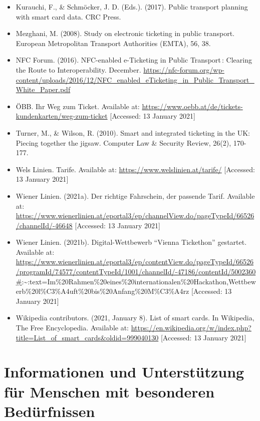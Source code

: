 \documentclass[
]{book}
\providecommand{\tightlist}{%
  \setlength{\itemsep}{0pt}\setlength{\parskip}{0pt}}
\begin{document}
\begin{itemize}
\tightlist
\item
  Kurauchi, F., \& Schmöcker, J. D. (Eds.). (2017). Public transport planning with smart card data. CRC Press.
\item
  Mezghani, M. (2008). Study on electronic ticketing in public transport. European Metropolitan Transport Authorities (EMTA), 56, 38.
\item
  NFC Forum. (2016). NFC-enabled e-Ticketing in Public Transport\,: Clearing the Route to Interoperability. December. \url{https://nfc-forum.org/wp-content/uploads/2016/12/NFC_enabled_eTicketing_in_Public_Transport_White_Paper.pdf}
\item
  ÖBB. Ihr Weg zum Ticket. Available at: \url{https://www.oebb.at/de/tickets-kundenkarten/weg-zum-ticket} {[}Accessed: 13 January 2021{]}
\item
  Turner, M., \& Wilson, R. (2010). Smart and integrated ticketing in the UK: Piecing together the jigsaw. Computer Law \& Security Review, 26(2), 170-177.
\item
  Wels Linien. Tarife. Available at: \url{https://www.welslinien.at/tarife/} {[}Accessed: 13 January 2021{]}
\item
  Wiener Linien. (2021a). Der richtige Fahrschein, der passende Tarif. Available at: \url{https://www.wienerlinien.at/eportal3/ep/channelView.do/pageTypeId/66526/channelId/-46648} {[}Accessed: 13 January 2021{]}
\item
  Wiener Linien. (2021b). Digital-Wettbewerb ``Vienna Tickethon'' gestartet. Available at: \url{https://www.wienerlinien.at/eportal3/ep/contentView.do/pageTypeId/66526/programId/74577/contentTypeId/1001/channelId/-47186/contentId/5002360\#}:\textasciitilde:text=Im\%20Rahmen\%20eines\%20internationalen\%20Hackathon,Wettbewerb\%20l\%C3\%A4uft\%20bis\%20Anfang\%20M\%C3\%A4rz {[}Accessed: 13 January 2021{]}
\item
  Wikipedia contributors. (2021, January 8). List of smart cards. In Wikipedia, The Free Encyclopedia. Available at: \url{https://en.wikipedia.org/w/index.php?title=List_of_smart_cards\&oldid=999040130} {[}Accessed: 13 January 2021{]}
\end{itemize}

\hypertarget{special_needs}{%
\section{Informationen und Unterstützung für Menschen mit besonderen Bedürfnissen}\label{special_needs}}
\end{document}
